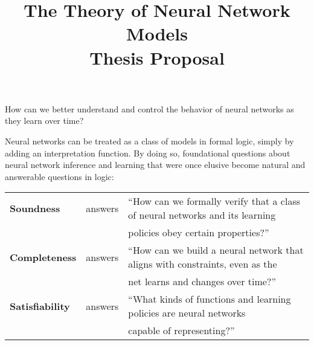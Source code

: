 \documentclass[letterpaper]{article}
\title{The Theory of Neural Network Models\\Thesis Proposal}
\begin{document}
\maketitle

\begin{question}
How can we better understand and control the behavior of neural networks as they learn over time?
\end{question}

\begin{thesis}
Neural networks can be treated as a class of models in formal logic, simply by adding an interpretation function.  By doing so, foundational questions about neural network inference and learning that were once elusive become natural and answerable questions in logic:

\begin{tabular}{lcl}
    \textbf{Soundness} & answers & ``How can we formally verify that a class of neural networks and its learning\\
    & & \quad policies obey certain properties?''\\
    \textbf{Completeness} & answers & ``How can we build a neural network that aligns with constraints, even as the\\
    & & \quad net learns and changes over time?''\\
    \textbf{Satisfiability} & answers & ``What kinds of functions and learning policies are neural networks\\
    & & \quad capable of representing?''\\
\end{tabular}
\end{thesis}
\end{document}
